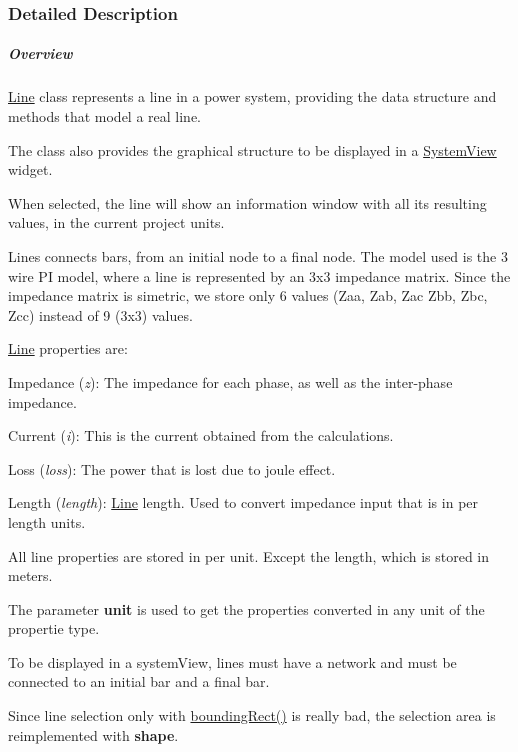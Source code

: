 \subsubsection{Detailed Description}
\subparagraph*{Overview}

\hyperlink{class_line}{Line} class represents a line in a power system, providing the data structure and methods that model a real line.

The class also provides the graphical structure to be displayed in a \hyperlink{class_system_view}{System\+View} widget.

When selected, the line will show an information window with all its resulting values, in the current project units.

Lines connects bars, from an initial node to a final node. The model used is the 3 wire P\+I model, where a line is represented by an 3x3 impedance matrix. Since the impedance matrix is simetric, we store only 6 values (Zaa, Zab, Zac Zbb, Zbc, Zcc) instead of 9 (3x3) values.

\hyperlink{class_line}{Line} properties are\+:
\begin{DoxyItemize}
\item Impedance ({\itshape z})\+: The impedance for each phase, as well as the inter-\/phase impedance.
\item Current ({\itshape i})\+: This is the current obtained from the calculations.
\item Loss ({\itshape loss})\+: The power that is lost due to joule effect.
\item Length ({\itshape length})\+: \hyperlink{class_line}{Line} length. Used to convert impedance input that is in per length units.
\end{DoxyItemize}

All line properties are stored in per unit. Except the length, which is stored in meters.

The parameter {\bfseries unit} is used to get the properties converted in any unit of the propertie type.

To be displayed in a system\+View, lines must have a network and must be connected to an initial bar and a final bar.

Since line selection only with \hyperlink{group___models_gad15c3af158d3b966c04be7e18cee5aea}{bounding\+Rect()} is really bad, the selection area is reimplemented with {\bfseries shape}.

